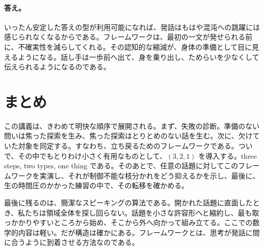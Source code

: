 \paragraph{答え。} いったん安定した答えの型が利用可能になれば、発話はもはや混沌への跳躍には感じられなくなるからである。フレームワークは、最初の一文が発せられる前に、不確実性を減らしてくれる。その認知的な縮減が、身体の準備として目に見えるようになる。話し手は一歩前へ出て、身を乗り出し、ためらいを少なくして伝えられるようになるのである。

\section{まとめ}

この講義は、きわめて明快な順序で展開される。まず、失敗の診断。準備のない問いは焦った探索を生み、焦った探索はとりとめのない話を生む。次に、欠けていた対象を同定する。すなわち、立ち戻るためのフレームワークである。ついで、その中でもとりわけ小さく有用なものとして、\((3,2,1)\) を導入する。three steps, two types, one thing である。そのあとで、任意の話題に対してこのフレームワークを実演し、それが制御不能な枝分かれをどう抑えるかを示し、最後に、生の時間圧のかかった練習の中で、その転移を確かめる。

最後に残るのは、簡潔なスピーキングの算法である。開かれた話題に直面したとき、私たちは領域全体を探し回らない。話題を小さな許容形へと縮約し、最も取っかかりやすいところから始め、そこから外へ向かって組み立てる。ここでの数学的内容は軽い。だが構造は確かにある。フレームワークとは、思考が発話に間に合うように到着させる方法なのである。